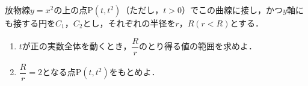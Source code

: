 放物線$y=x^2$の上の点$\mathrm{P}(t,t^2)$（ただし，$t>0$）でこの曲線に接し，かつ$y$軸にも接する円を$C_1$，$C_2$とし，それぞれの半径を$r$，$R(r<R)$とする．
\begin{enumerate}
  \item $t$が正の実数全体を動くとき，$\dfrac{R}{r}$のとり得る値の範囲を求めよ．
  \item $\dfrac{R}{r}=2$となる点$\mathrm{P}(t,t^2)$をもとめよ．
\end{enumerate}
